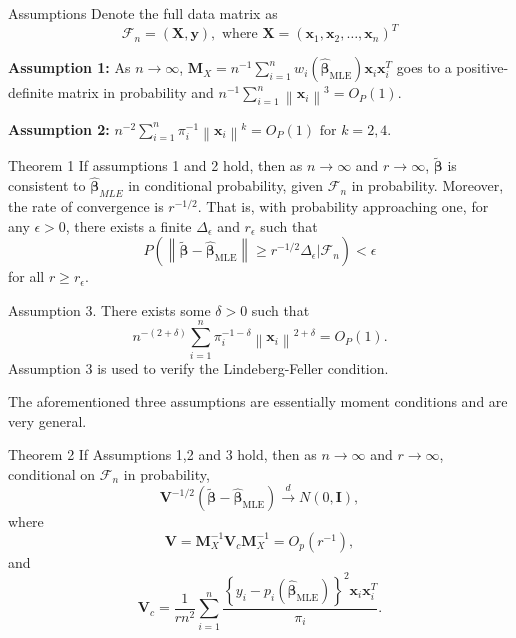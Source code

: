 \documentclass[12pt]{beamer}
\begin{document}
\begin{frame}{Assumptions}
Denote the full data matrix as 
$$\mathcal{F}_{n}=(\mathbf{X}, \mathbf{y}), \text { where } \mathbf{X}=\left(\mathbf{x}_{1}, \mathbf{x}_{2}, \ldots, \mathbf{x}_{n}\right)^{T}
$$

\textbf{Assumption 1:} As $ n\to \infty$, $\mathbf{M}_{X}=n^{-1} \sum_{i=1}^{n} w_{i}\left(\hat{\boldsymbol{\beta}}_{\mathrm{MLE}}\right) \mathbf{x}_{i} \mathbf{x}_{i}^{T}$ goes to a positive-definite matrix in probability and $n^{-1} \sum_{i=1}^{n}\left\|\mathbf{x}_{i}\right\|^{3}=O_{P}(1)$.

\textbf{Assumption 2:} $n^{-2} \sum_{i=1}^{n} \pi_{i}^{-1}\left\|\mathbf{x}_{i}\right\|^{k}=O_{P}(1) \text { for } k=2,4$. 
\end{frame}

\begin{frame}{Theorem 1}
If assumptions 1 and 2 hold, then as $n \to \infty$ and $r\to \infty$, $\tilde{\mathbf{\beta}}$ is consistent to $\hat{\mathbf{\beta}}_{MLE}$ in conditional probability, given $\mathcal{F}_n$ in probability. Moreover, the rate of convergence is $r^{-1/2}$. That is, with probability approaching one, for any $\epsilon>0$, there exists a finite $\Delta_{\epsilon}$ and $r_{\epsilon}$ such that
$$
P\left(\left\|\tilde{\boldsymbol{\beta}}-\hat{\boldsymbol{\beta}}_{\mathrm{MLE}}\right\| \geq r^{-1 / 2} \Delta_{\epsilon} | \mathcal{F}_{n}\right)<\epsilon
$$
for all $r\ge r_{\epsilon}$.
\end{frame}

\begin{frame}{Assumption 3.} There exists some $\delta>0$ such that 
$$
n^{-(2+\delta)} \sum_{i=1}^{n} \pi_{i}^{-1-\delta}\left\|\mathbf{x}_{i}\right\|^{2+\delta}=O_{P}(1).
$$
Assumption 3 is used to verify the Lindeberg-Feller condition.

The aforementioned three assumptions are essentially
moment conditions and are very general.
\end{frame}

\begin{frame}{Theorem 2}
If Assumptions 1,2 and 3 hold, then as $n \to \infty$ and $r\to \infty$, conditional on $\mathcal{F}_n$ in probability, 
$$
\mathbf{V}^{-1 / 2}\left(\tilde{\boldsymbol{\beta}}-\hat{\boldsymbol{\beta}}_{\mathrm{MLE}}\right) \stackrel{d}{\to} N(0, \mathbf{I}),
$$
where
$$
\mathbf{V}=\mathbf{M}_{X}^{-1} \mathbf{V}_{c} \mathbf{M}_{X}^{-1}=O_{p}\left(r^{-1}\right),
$$
and 
$$
\mathbf{V}_{c}=\frac{1}{r n^{2}} \sum_{i=1}^{n} \frac{\left\{y_{i}-p_{i}\left(\hat{\boldsymbol{\beta}}_{\mathrm{MLE}}\right)\right\}^{2} \mathbf{x}_{i} \mathbf{x}_{i}^{T}}{\pi_{i}}.
$$
\end{frame}
\end{document}
